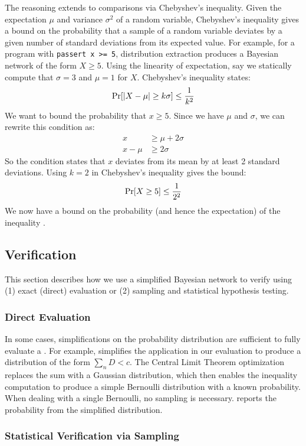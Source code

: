 The reasoning extends to comparisons via Chebyshev's inequality.
Given the expectation $\mu$ and variance $\sigma^2$ of a random variable,
Chebyshev's inequality
gives a bound on the probability that a sample of a random variable deviates
by a given number of standard deviations from its expected value.
For example, for a program with
\lstinline{passert x >= 5}, distribution extraction produces a Bayesian
network of the form $X \ge 5$.
Using the linearity of expectation, say we statically compute that $\sigma = 3$ and $\mu = 1$ for
$X$. Chebyshev's inequality states:
%
$$\Pr\!\left[|X - \mu| \ge k\sigma\right] \le \frac{1}{k^2}$$
%
We want to bound the probability that $x \ge 5$. Since we have $\mu$ and $\sigma$, we can rewrite this condition as:
%
\begin{align*}
x &\ge \mu + 2\sigma \\
x - \mu &\ge 2\sigma
\end{align*}
%
So the \passert condition states that $x$ deviates from its mean by at least 2
standard deviations. Using $k=2$ in Chebyshev's inequality gives the bound:
%
$$\Pr\!\left[X \ge 5\right] \le \frac{1}{2^2}$$
%
We now have a bound on the probability (and hence the expectation) of the
inequality .


\subsection{Verification}
\label{sec:verification}
This section describes how we use a simplified Bayesian network to verify
\passerts using (1) exact (direct) evaluation or (2) sampling and
statistical hypothesis testing.

\subsubsection{Direct Evaluation}
\label{sec:exact}
In some cases, simplifications on the probability distribution are
sufficient to fully evaluate a \passert. For example, \tool simplifies
the  application in our evaluation to produce a
distribution of the form $\sum_n D < c$. The Central Limit Theorem
optimization replaces the sum with a Gaussian distribution, which then
enables the inequality computation to produce a simple Bernoulli
distribution with a known probability.  When dealing with a single
Bernoulli, no sampling is necessary. \tool reports the probability
from the simplified distribution.

\subsubsection{Statistical Verification via Sampling}
\label{sec:sample}

